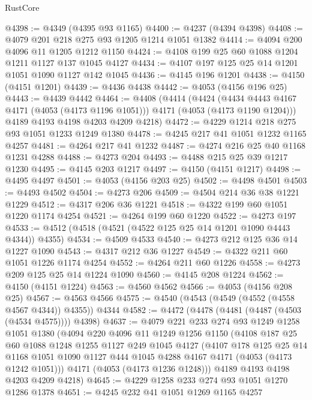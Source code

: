 \begin{lexlean}{RustCore}
\begin{coremodule}
@4398 := @4349 (@4395 @93 @1165)
@4400 := @4237 (@4394 @4398)
@4408 := @4079 @201 @218 @275 @93 @1205 @1214 @1051 @1382
@4414 := @4094 @200 @4096 @11 @1205 @1212 @1150
@4424 := @4108 @199 @25 @60 @1088 @1204 @1211 @1127 @137 @1045 @4127
@4434 := @4107 @197 @125 @25 @14 @1201 @1051 @1090 @1127 @142 @1045
@4436 := @4145 @196 @1201
@4438 := @4150 (@4151 @1201)
@4439 := @4436 @4438
@4442 := @4053 (@4156 @196 @25)
@4443 := @4439 @4442
@4464 := @4408
    (@4414
      (@4424
        (@4434 @4443 @4167 @4171 (@4053 (@4173 @1196 @1051)))
        @4171
        (@4053 (@4173 @1190 @1204)))
      @4189
      @4193
      @4198
      @4203
      @4209
      @4218)
@4472 := @4229 @1214 @218 @275 @93 @1051 @1233 @1249 @1380
@4478 := @4245 @217 @41 @1051 @1232 @1165 @4257
@4481 := @4264 @217 @41 @1232
@4487 := @4274 @216 @25 @40 @1168 @1231 @4288
@4488 := @4273 @204
@4493 := @4488 @215 @25 @39 @1217 @1230
@4495 := @4145 @203 @1217
@4497 := @4150 (@4151 @1217)
@4498 := @4495 @4497
@4501 := @4053 (@4156 @203 @25)
@4502 := @4498 @4501
@4503 := @4493 @4502
@4504 := @4273 @206
@4509 := @4504 @214 @36 @38 @1221 @1229
@4512 := @4317 @206 @36 @1221
@4518 := @4322 @199 @60 @1051 @1220 @1174 @4254
@4521 := @4264 @199 @60 @1220
@4522 := @4273 @197
@4533 := @4512 (@4518 (@4521 (@4522 @125 @25 @14 @1201 @1090 @4443 @4344)) @4355)
@4534 := @4509 @4533
@4540 := @4273 @212 @125 @36 @14 @1227 @1090
@4543 := @4317 @212 @36 @1227
@4549 := @4322 @211 @60 @1051 @1226 @1174 @4254
@4552 := @4264 @211 @60 @1226
@4558 := @4273 @209 @125 @25 @14 @1224 @1090
@4560 := @4145 @208 @1224
@4562 := @4150 (@4151 @1224)
@4563 := @4560 @4562
@4566 := @4053 (@4156 @208 @25)
@4567 := @4563 @4566
@4575 := @4540 (@4543 (@4549 (@4552 (@4558 @4567 @4344)) @4355)) @4344
@4582 := @4472 (@4478 (@4481 (@4487 (@4503 (@4534 @4575)))) @4398)
@4637 := @4079
    @221
    @233
    @274
    @93
    @1249
    @1258
    @1051
    @1380
    (@4094
      @220
      @4096
      @11
      @1249
      @1256
      @1150
      (@4108
        @187
        @25
        @60
        @1088
        @1248
        @1255
        @1127
        @249
        @1045
        @4127
        (@4107
          @178
          @125
          @25
          @14
          @1168
          @1051
          @1090
          @1127
          @444
          @1045
          @4288
          @4167
          @4171
          (@4053 (@4173 @1242 @1051)))
        @4171
        (@4053 (@4173 @1236 @1248)))
      @4189
      @4193
      @4198
      @4203
      @4209
      @4218)
@4645 := @4229 @1258 @233 @274 @93 @1051 @1270 @1286 @1378
@4651 := @4245 @232 @41 @1051 @1269 @1165 @4257

\end{coremodule}
\end{lexlean}
